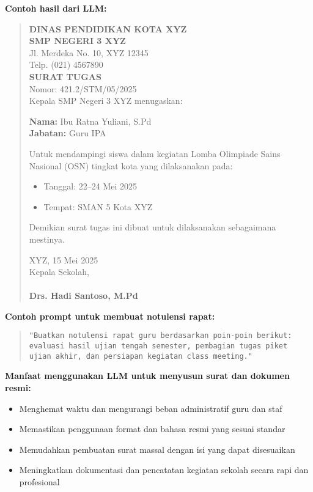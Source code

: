\textbf{Contoh hasil dari LLM:}

\begin{quote}
	\textbf{DINAS PENDIDIKAN KOTA XYZ}\\
	\textbf{SMP NEGERI 3 XYZ}\\
	Jl. Merdeka No. 10, XYZ 12345\\
	Telp. (021) 4567890 \\[1em]
	
	\textbf{SURAT TUGAS}\\
	Nomor: 421.2/STM/05/2025 \\[1em]
	
	Kepala SMP Negeri 3 XYZ menugaskan:
	
	\textbf{Nama:} Ibu Ratna Yuliani, S.Pd \\
	\textbf{Jabatan:} Guru IPA
	
	Untuk mendampingi siswa dalam kegiatan Lomba Olimpiade Sains Nasional (OSN) tingkat kota yang dilaksanakan pada:
	
	\begin{itemize}
		\item Tanggal: 22–24 Mei 2025
		\item Tempat: SMAN 5 Kota XYZ
	\end{itemize}
	
	Demikian surat tugas ini dibuat untuk dilaksanakan sebagaimana mestinya.
	
	XYZ, 15 Mei 2025 \\
	Kepala Sekolah,\\
	\hspace*{1em} \\
	\textbf{Drs. Hadi Santoso, M.Pd}
\end{quote}

\textbf{Contoh prompt untuk membuat notulensi rapat:}

\begin{quote}
	\centering
	\texttt{"Buatkan notulensi rapat guru berdasarkan poin-poin berikut: evaluasi hasil ujian tengah semester, pembagian tugas piket ujian akhir, dan persiapan kegiatan class meeting."}
\end{quote}

\textbf{Manfaat menggunakan LLM untuk menyusun surat dan dokumen resmi:}
\begin{itemize}
	\item Menghemat waktu dan mengurangi beban administratif guru dan staf
	\item Memastikan penggunaan format dan bahasa resmi yang sesuai standar
	\item Memudahkan pembuatan surat massal dengan isi yang dapat disesuaikan
	\item Meningkatkan dokumentasi dan pencatatan kegiatan sekolah secara rapi dan profesional
\end{itemize}

